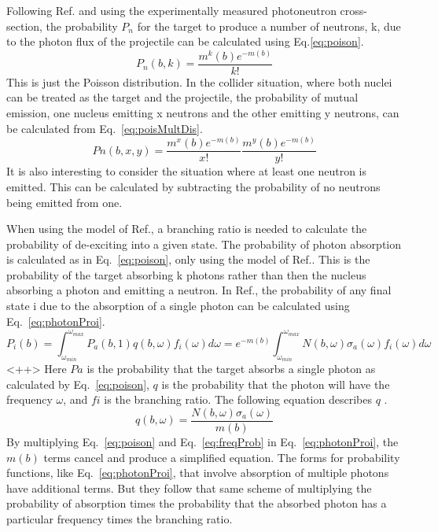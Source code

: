     Following Ref.\cite{emPCite3} and using the experimentally measured photoneutron 
    cross-section, the probability $P_{n}$ for the target to produce a number 
    of neutrons, k, due to the photon flux of the projectile can be calculated 
    using Eq.\ref{eq:poison}.
    \begin{equation}
      P_{n}(b,k)=\frac{m^{k}(b)e^{-m(b)}}{k!}
      \label{eq:poison}
    \end{equation}
    This is just the Poisson distribution.
    In the collider situation, where both nuclei can be treated as the target 
      and the projectile, the probability of mutual emission, one nucleus 
      emitting x neutrons and the other emitting y neutrons, can be calculated 
      from Eq.~\ref{eq:poisMultDis}.
    \begin{equation}
      P{n}(b,x,y)=\frac{m^{x}(b)e^{-m(b)}}{x!}\frac{m^{y}(b)e^{-m(b)}}{y!}
      \label{eq:poisMultDis}
    \end{equation}
    It is also interesting to consider the situation where at least one neutron
      is emitted.
    This can be calculated by subtracting the probability of no neutrons being 
      emitted from one.

    When using the model of Ref.\cite{emPCite4}, a branching ratio is needed to calculate 
      the probability of de-exciting into a given state.
    The probability of photon absorption is calculated as in Eq.~\ref{eq:poison}, only using 
      the model of Ref.\cite{emPCite4}.
    This is the probability of the target absorbing k photons rather than then 
      the nucleus absorbing a photon and emitting a neutron.
    In Ref.\cite{emPCite4}, the probability of any final state i due to the absorption of a
      single photon can be calculated using Eq.~\ref{eq:photonProi}.
    \begin{equation}
      P_{i}(b)=\int^{\omega_{max}}_{\omega_{min}}P_{a}(b,1)q(b,\omega)f_{i}(\omega)d\omega=
      e^{-m(b)}\int^{\omega_{max}}_{\omega_{min}}N(b,\omega)\sigma_{a}(\omega)f_{i}(\omega)d\omega
      \label{eq:photonProi}
    \end{equation}<++>
    Here $P{a}$ is the probability that the target absorbs a single photon as 
      calculated by Eq.~\ref{eq:poison}, $q$ is the probability that the photon will have the
      frequency $\omega$, and $f{i}$ is the branching ratio.
    The following equation describes $q$ \cite{emPCite5}.
    \begin{equation}
      q(b,\omega)=\frac{N(b,\omega)\sigma_{a}(\omega)}{m(b)}
      \label{eq:freqProb}
    \end{equation}
    By multiplying Eq.~\ref{eq:poison} and Eq.~\ref{eq:freqProb} in 
      Eq.~\ref{eq:photonProi}, the $m(b)$ terms cancel and produce a simplified
      equation.
    The forms for probability functions, like Eq.~\ref{eq:photonProi}, that 
      involve absorption of multiple photons have additional terms.
    But they follow that same scheme of multiplying the probability of 
      absorption times the probability that the absorbed photon has a 
      particular frequency times the branching ratio.

